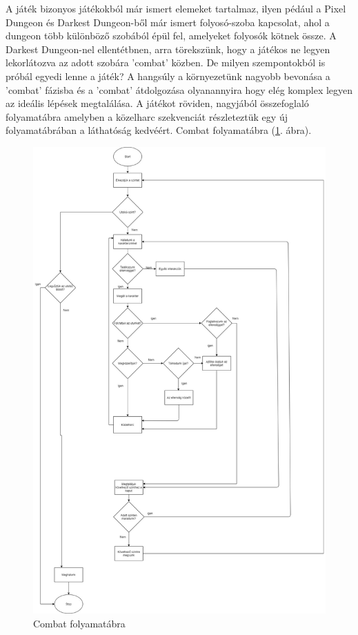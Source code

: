 

A játék bizonyos játékokból már ismert elemeket tartalmaz, ilyen pédául a Pixel Dungeon és Darkest Dungeon-ből már ismert folyosó-szoba kapcsolat, ahol a dungeon több különböző szobából épül fel, amelyeket folyosók kötnek össze. A Darkest Dungeon-nel ellentétbnen, arra törekszünk, hogy a játékos ne legyen lekorlátozva az adott szobára 'combat' közben.
De milyen szempontokból is próbál egyedi lenne a játék? A hangsúly a környezetünk nagyobb bevonása a 'combat' fázisba és a 'combat' átdolgozása olyanannyira hogy elég komplex legyen az ideális lépések megtalálása.
A játékot röviden, nagyjából összefoglaló folyamatábra amelyben a közelharc szekvenciát részleteztük egy új folyamatábrában a láthatóság kedvéért. Combat folyamatábra (\ref{fig:combat}. ábra).

\begin{figure}[!ht]
	\centering
	\includegraphics[width=\textwidth]{images/image1.png}
	\caption{Combat folyamatábra}
	\label{fig:combat}
\end{figure}

